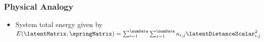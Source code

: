 \subsubsection{Physical Analogy}
\begin{itemize}
\item System total energy given by
  $
  E(\latentMatrix, \springMatrix) = \sum_{i=1}^\numData \sum_{j=1}^\numData \kappa_{i,j} \latentDistanceScalar_{i,j}^2
  $
\end{itemize}
\begin{figure}
  \begin{comment}
  \begin{pgfpicture}{0\textwidth}{-0.1\textheight}{0.4\textwidth}{0.5\textheight}
    \pgfsetxvec{\pgfpoint{0.4\textwidth}{0}}
    \pgfsetyvec{\pgfpoint{0}{0.4\textheight}}

    \pgfputat{\pgfxy(0,1)}{\pgfbox[left,base]{\texttt{[image: ../diagrams/springEnergy]}}}
    \llap{
        \pgfputat{\pgfxy(0.615, 0.755)}{\pgfbox[left,base]{{\scriptsize $1$}}}
        \pgfputat{\pgfxy(0.325, 0.852)}{\pgfbox[left,base]{{\scriptsize $2$}}}
        \pgfputat{\pgfxy(0.605, 0.545)}{\pgfbox[left,base]{{\scriptsize $3$}}}
        \pgfputat{\pgfxy(0.945, 0.64)}{\pgfbox[left,base]{{\scriptsize $4$}}}
        \pgfputat{\pgfxy(0.322, 0.23)}{\pgfbox[left,base]{{\scriptsize $5$}}}
        \pgfputat{\pgfxy(0.295, 0.43)}{\pgfbox[left,base]{{\scriptsize $6$}}}
        \pgfputat{\pgfxy(0.03, 0.21)}{\pgfbox[left,base]{{\scriptsize $7$}}}
        \pgfputat{\pgfxy(0.364, 0.03)}{\pgfbox[left,base]{{\scriptsize $8$}}}
        \pgfputat{\pgfxy(0.66, 0.25)}{\pgfbox[left,base]{{\scriptsize $9$}}}
    }
      {       \color{red}
        \pgfsetendarrow{\pgfarrowto}
        \newcommand{\startPoint}{\pgfpartway{1.35}{\pgfxy(0.5, 0.5)}{\pgfxy(0.615, 0.755)}}
        \newcommand{\finishPoint}{\pgfpartway{1.5}{\pgfxy(0.5, 0.5)}{\startPoint}}
        \pgfline{\startPoint}{\finishPoint}
        \renewcommand{\startPoint}{\pgfpartway{1.3}{\pgfxy(0.5, 0.5)}{\pgfxy(0.325, 0.852)}}
        \renewcommand{\finishPoint}{\pgfpartway{1.45}{\pgfxy(0.5, 0.5)}{\startPoint}}
        \pgfline{\startPoint}{\finishPoint}
        \renewcommand{\startPoint}{\pgfpartway{1.55}{\pgfxy(0.5, 0.5)}{\pgfxy(0.605, 0.545)}}
        \renewcommand{\finishPoint}{\pgfpartway{1.7}{\pgfxy(0.5, 0.5)}{\startPoint}}
        \pgfline{\startPoint}{\finishPoint}
        \renewcommand{\startPoint}{\pgfpartway{1.2}{\pgfxy(0.5, 0.5)}{\pgfxy(0.945, 0.64)}}
        \renewcommand{\finishPoint}{\pgfpartway{1.35}{\pgfxy(0.5, 0.5)}{\startPoint}}
        \pgfline{\startPoint}{\finishPoint}
        

\end{comment}
\end{figure}
